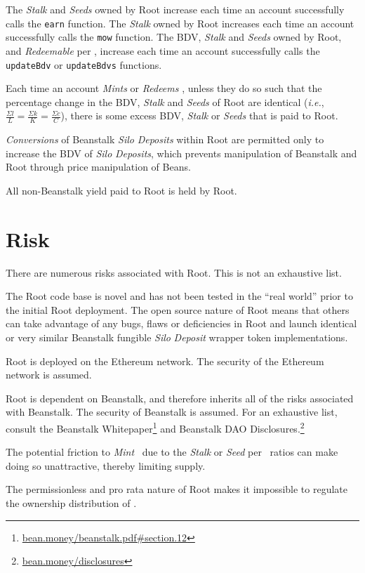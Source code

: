 \documentclass[tikz]{article}
\newcommand{\code}[1]{\texttt{#1}}
\newcommand{\term}[1]{\textsl{#1}}
\newcommand{\fref}[1]{\footnote{\href{http://#1}{#1}}}
\newcommand{\Root}{} %
\begin{document}
The \term{Stalk} and \term{Seeds} owned by Root increase each time an account successfully calls the \code{earn} function. The \term{Stalk} owned by Root increases each time an account successfully calls the \code{mow} function. The BDV, \term{Stalk} and \term{Seeds} owned by Root, and \term{Redeemable} per \Root, increase each time an account successfully calls the \code{updateBdv} or \code{updateBdvs} functions. 

Each time an account \term{Mints} or \term{Redeems} \Root, unless they do so such that the percentage change in the BDV, \term{Stalk} and \term{Seeds} of Root are identical (\term{i.e.}, $\frac{\Sigma l}{L} = \frac{\Sigma k}{K} = \frac{\Sigma c}{C}$), there is some excess BDV, \term{Stalk} or \term{Seeds} that is paid to Root.

\term{Conversions} of Beanstalk \term{Silo} \term{Deposits} within Root are permitted only to increase the BDV of \term{Silo} \term{Deposits}, which prevents manipulation of Beanstalk and Root through price manipulation of Beans.

All non-Beanstalk yield paid to Root is held by Root.

\newpage
\section{Risk}
There are numerous risks associated with Root. This is not an exhaustive list.

The Root code base is novel and has not been tested in the “real world” prior to the initial Root deployment. The open source nature of Root means that others can take advantage of any bugs, flaws or deficiencies in Root and launch identical or very similar Beanstalk fungible \term{Silo} \term{Deposit} wrapper token implementations. 

Root is deployed on the Ethereum network. The security of the Ethereum network is assumed. 

Root is dependent on Beanstalk, and therefore inherits all of the risks associated with Beanstalk. The security of Beanstalk is assumed. For an exhaustive list, consult the Beanstalk Whitepaper\fref{bean.money/beanstalk.pdf\#section.12} and Beanstalk DAO Disclosures.\fref{bean.money/disclosures}

The potential friction to \term{Mint} \Root\ due to the \term{Stalk} or \term{Seed} per \Root\ ratios can make doing so unattractive, thereby limiting supply.

The permissionless and pro rata nature of Root makes it impossible to regulate the ownership distribution of \Root. 
\end{document}
